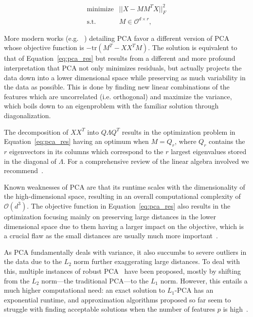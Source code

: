 \begin{eqnarray}
    \text{minimize} & || X - MM^TX ||_F^2 \\
    \text{s.t.} & M \in \mathcal{O}^{d \times r},
    \label{eq:pca_res}
\end{eqnarray}

More modern works (e.g. ~\cite{bishop}) detailing PCA favor a different version
of PCA whose objective function is $-\text{tr}(M^T - XX^T M)$. The solution is
equivalent to that of Equation~\ref{eq:pca_res} but results from a different
and more profound interpretation that PCA not only minimizes residuals, but
actually projects the data down into a lower dimensional space while preserving
as much variability in the data as possible. This is done by finding new linear
combinations of the features which are uncorrelated (i.e. orthogonal) and
maximize the variance, which boils down to an eigenproblem with the familiar
solution through diagonalization.

The decomposition of $XX^T$ into $Q \Lambda Q^T$ results in the optimization
problem in Equation~\ref{eq:pca_res} having an optimum when $M = Q_r$, where
$Q_r$ contains the $r$ eigenvectors in its columns which correspond to the $r$
largest eigenvalues stored in the diagonal of $\Lambda$. For a comprehensive
review of the linear algebra involved we recommend~\cite{pca_tut}.

Known weaknesses of PCA are that its runtime scales with the dimensionality of the
high-dimensional space, resulting in an overall computational complexity of $\mathcal{O}(d^3)$.  The objective function
in Equation~\ref{eq:pca_res} also results in the optimization focusing mainly on
preserving large distances in the lower dimensional space due to them having a
larger impact on the objective, which is a crucial flaw as the small distances
are usually much more important~\cite{vandermaaten_review}.

As PCA fundamentally deals with variance, it also succumbs to severe outliers
in the data due to the $L_2$ norm further exaggerating large distances. To deal
with this, multiple instances of robust PCA~\cite{robust_pca_pp_li_chen,robust_pca_galpin,
robust_pca_gao,r1_pca, pca_pp,robust_pca_candes,linearsurvey} have been proposed, mostly by shifting from the
$L_2$ norm---the traditional PCA---to the $L_1$ norm. However, this entails a
much higher computational need: an exact solution to $L_1$-PCA has an
exponential runtime, and approximation algorithms proposed so far seem to
struggle with finding acceptable solutions when the number of features $p$ is
high~\cite{pca_pp}.

